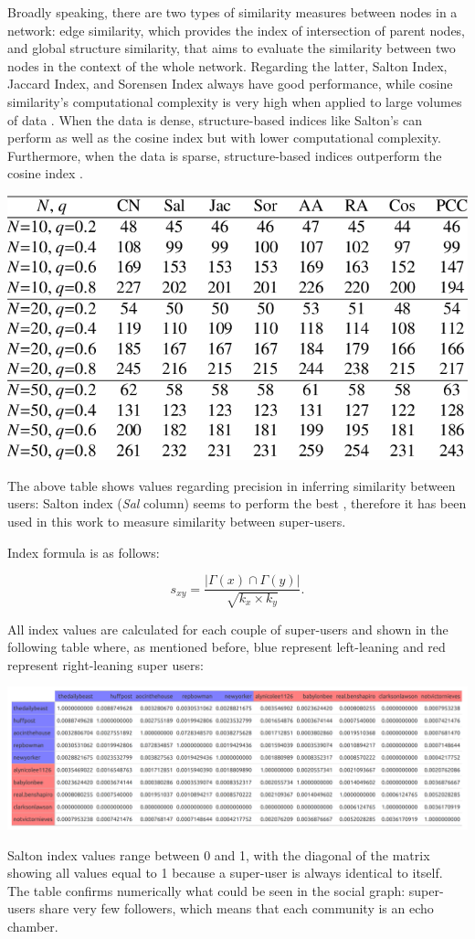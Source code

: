 Broadly speaking, there are two types of similarity measures between nodes in a network: edge similarity, which provides the index of intersection of parent nodes, and global structure similarity, that aims to evaluate the similarity between two nodes in the context of the whole network. Regarding the latter, Salton Index, Jaccard Index, and Sorensen Index always have good performance, while cosine similarity's computational complexity is very high when applied to large volumes of data \cite{smilarityMeasuresSurvey}. When the data is dense, structure-based indices like Salton's can perform as well as the cosine index but with lower computational complexity. Furthermore, when the data is sparse, structure-based indices outperform the cosine index \cite{10.1016/j.phpro.2010.07.033}.

\aCapo{}
\includegraphics[width = .5\textwidth]{images/salton_precision.png}

The above table shows values regarding precision in inferring similarity between users: Salton index (\textit{Sal} column) seems to perform the best \cite{10.1016/j.phpro.2010.07.033}, therefore it has been used in this work to measure similarity between super-users.

Index formula is as follows: 

$$s_{xy}=\frac{|\Gamma(x)\cap\Gamma(y)|}{\sqrt{k_x\times k_y}}.$$

All index values are calculated for each couple of super-users and shown in the following table where, as mentioned before, blue represent left-leaning and red represent right-leaning super users: 

\aCapo{}
\includegraphics[width = .5\textwidth]{images/final_salton_matrix.png}

Salton index values range between 0 and 1, with the diagonal of the matrix showing all values equal to 1 because a super-user is always identical to itself. The table confirms numerically what could be seen in the social graph: super-users share very few followers, which means that each community is an echo chamber.

